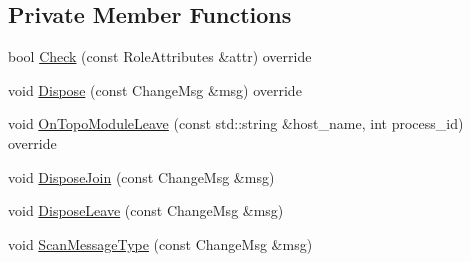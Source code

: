 \subsection*{Private Member Functions}
\begin{DoxyCompactItemize}
\item 
bool \hyperlink{classapollo_1_1cyber_1_1service__discovery_1_1ChannelManager_a470b79e3a7780121ede3552956722cf7}{Check} (const Role\-Attributes \&attr) override
\item 
void \hyperlink{classapollo_1_1cyber_1_1service__discovery_1_1ChannelManager_ae4ed92f11a64d7ef4bb30680dad64493}{Dispose} (const Change\-Msg \&msg) override
\item 
void \hyperlink{classapollo_1_1cyber_1_1service__discovery_1_1ChannelManager_a4e39fc638d77bbe6d397299fa30ff6d6}{On\-Topo\-Module\-Leave} (const std\-::string \&host\-\_\-name, int process\-\_\-id) override
\item 
void \hyperlink{classapollo_1_1cyber_1_1service__discovery_1_1ChannelManager_aea63c8f1e8d638ef930c3c7ddd3b62ab}{Dispose\-Join} (const Change\-Msg \&msg)
\item 
void \hyperlink{classapollo_1_1cyber_1_1service__discovery_1_1ChannelManager_aa39a85495ea9eb83d6946405576bd1cb}{Dispose\-Leave} (const Change\-Msg \&msg)
\item 
void \hyperlink{classapollo_1_1cyber_1_1service__discovery_1_1ChannelManager_af48675ed66194fca37daad411c19d589}{Scan\-Message\-Type} (const Change\-Msg \&msg)
\end{DoxyCompactItemize}
